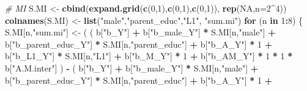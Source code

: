 \documentclass[
]{book}
\newenvironment{Shaded}{\begin{snugshade}}{\end{snugshade}}
\newcommand{\AttributeTok}[1]{\textcolor[rgb]{0.13,0.29,0.53}{#1}}
\newcommand{\CommentTok}[1]{\textcolor[rgb]{0.56,0.35,0.01}{\textit{#1}}}
\newcommand{\ConstantTok}[1]{\textcolor[rgb]{0.56,0.35,0.01}{#1}}
\newcommand{\ControlFlowTok}[1]{\textcolor[rgb]{0.13,0.29,0.53}{\textbf{#1}}}
\newcommand{\DecValTok}[1]{\textcolor[rgb]{0.00,0.00,0.81}{#1}}
\newcommand{\FunctionTok}[1]{\textcolor[rgb]{0.13,0.29,0.53}{\textbf{#1}}}
\newcommand{\NormalTok}[1]{#1}
\newcommand{\OtherTok}[1]{\textcolor[rgb]{0.56,0.35,0.01}{#1}}
\newcommand{\SpecialCharTok}[1]{\textcolor[rgb]{0.81,0.36,0.00}{\textbf{#1}}}
\newcommand{\StringTok}[1]{\textcolor[rgb]{0.31,0.60,0.02}{#1}}
\begin{document}
\begin{Shaded}
\begin{Highlighting}[]
  \CommentTok{\# MI }
\NormalTok{  S.MI }\OtherTok{\textless{}{-}} \FunctionTok{cbind}\NormalTok{(}\FunctionTok{expand.grid}\NormalTok{(}\FunctionTok{c}\NormalTok{(}\DecValTok{0}\NormalTok{,}\DecValTok{1}\NormalTok{),}\FunctionTok{c}\NormalTok{(}\DecValTok{0}\NormalTok{,}\DecValTok{1}\NormalTok{),}\FunctionTok{c}\NormalTok{(}\DecValTok{0}\NormalTok{,}\DecValTok{1}\NormalTok{)), }\FunctionTok{rep}\NormalTok{(}\ConstantTok{NA}\NormalTok{,}\AttributeTok{n=}\DecValTok{2}\SpecialCharTok{\^{}}\DecValTok{4}\NormalTok{))}
  \FunctionTok{colnames}\NormalTok{(S.MI) }\OtherTok{\textless{}{-}} \FunctionTok{list}\NormalTok{(}\StringTok{"male"}\NormalTok{,}\StringTok{"parent\_educ"}\NormalTok{,}\StringTok{"L1"}\NormalTok{, }\StringTok{"sum.mi"}\NormalTok{)}
  \ControlFlowTok{for}\NormalTok{ (n }\ControlFlowTok{in} \DecValTok{1}\SpecialCharTok{:}\DecValTok{8}\NormalTok{) \{}
\NormalTok{    S.MI[n,}\StringTok{"sum.mi"}\NormalTok{] }\OtherTok{\textless{}{-}}\NormalTok{ ( ( b[}\StringTok{"b\_Y"}\NormalTok{] }\SpecialCharTok{+} 
\NormalTok{                              b[}\StringTok{"b\_male\_Y"}\NormalTok{] }\SpecialCharTok{*}\NormalTok{ S.MI[n,}\StringTok{"male"}\NormalTok{] }\SpecialCharTok{+} 
\NormalTok{                              b[}\StringTok{"b\_parent\_educ\_Y"}\NormalTok{] }\SpecialCharTok{*}\NormalTok{ S.MI[n,}\StringTok{"parent\_educ"}\NormalTok{] }\SpecialCharTok{+} 
\NormalTok{                              b[}\StringTok{"b\_A\_Y"}\NormalTok{] }\SpecialCharTok{*} \DecValTok{1} \SpecialCharTok{+} 
\NormalTok{                              b[}\StringTok{"b\_L1\_Y"}\NormalTok{] }\SpecialCharTok{*}\NormalTok{ S.MI[n,}\StringTok{"L1"}\NormalTok{] }\SpecialCharTok{+}
\NormalTok{                              b[}\StringTok{"b\_M\_Y"}\NormalTok{] }\SpecialCharTok{*} \DecValTok{1} \SpecialCharTok{+}
\NormalTok{                              b[}\StringTok{"b\_AM\_Y"}\NormalTok{] }\SpecialCharTok{*} \DecValTok{1} \SpecialCharTok{*} \DecValTok{1} \SpecialCharTok{*}\NormalTok{ b[}\StringTok{"A.M.inter"}\NormalTok{] ) }\SpecialCharTok{{-}} 
\NormalTok{                            ( b[}\StringTok{"b\_Y"}\NormalTok{] }\SpecialCharTok{+} 
\NormalTok{                                b[}\StringTok{"b\_male\_Y"}\NormalTok{] }\SpecialCharTok{*}\NormalTok{ S.MI[n,}\StringTok{"male"}\NormalTok{] }\SpecialCharTok{+} 
\NormalTok{                                b[}\StringTok{"b\_parent\_educ\_Y"}\NormalTok{] }\SpecialCharTok{*}\NormalTok{ S.MI[n,}\StringTok{"parent\_educ"}\NormalTok{] }\SpecialCharTok{+} 
\NormalTok{                                b[}\StringTok{"b\_A\_Y"}\NormalTok{] }\SpecialCharTok{*} \DecValTok{1} \SpecialCharTok{+} 

\end{Highlighting}
\end{Shaded}
\end{document}
